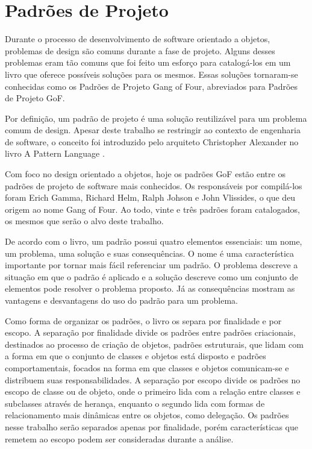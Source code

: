 \chapter{Padrões de Projeto}

Durante o processo de desenvolvimento de software 
orientado a objetos, 
problemas de design são comuns durante a 
fase de projeto. Alguns desses problemas 
eram tão comuns que foi feito um esforço para catalogá-los 
em um livro \cite{gamma:1995} que oferece possíveis soluções para os mesmos. 
Essas soluções tornaram-se conhecidas como 
os Padrões de Projeto Gang of Four, abreviados 
para Padrões de Projeto GoF.

Por definição, um padrão de projeto é uma solução 
reutilizável para um problema comum de design. Apesar 
deste trabalho se restringir ao contexto de engenharia 
de software, o conceito foi introduzido pelo arquiteto 
Christopher Alexander no livro A Pattern Language 
\cite{alexanderpatternlanguage}.

Com foco no design orientado a objetos, hoje os 
padrões GoF estão entre os padrões de 
projeto de software mais conhecidos. Os responsáveis 
por compilá-los foram Erich Gamma, Richard Helm, 
Ralph Johson e John Vlissides, o que deu origem ao 
nome Gang of Four. Ao todo, vinte e três 
padrões foram catalogados, os mesmos que serão o alvo 
deste trabalho.

De acordo com o livro, um padrão possui quatro elementos 
essenciais: um nome, um problema, uma solução e suas 
consequências. O nome é uma característica importante 
por tornar mais fácil referenciar um padrão. O problema 
descreve a situação em que o padrão é aplicado e 
a solução descreve como um conjunto de elementos pode 
resolver o problema proposto. Já as consequências 
mostram as vantagens e desvantagens do uso do padrão 
para um problema.

Como forma de organizar os padrões, o livro os separa 
por finalidade e por escopo. A separação por finalidade 
divide os padrões entre padrões criacionais, 
destinados ao processo de criação de objetos, padrões 
estruturais, que lidam com a forma em que o conjunto de 
classes e objetos está disposto e padrões comportamentais, 
focados na forma em que classes e objetos comunicam-se 
e distribuem suas responsabilidades. A separação por 
escopo divide os padrões no escopo de classe ou de objeto, 
onde o primeiro lida com a relação entre classes e 
subclasses através de herança, enquanto o segundo lida 
com formas de relacionamento mais dinâmicas entre os 
objetos, como delegação. Os padrões nesse trabalho 
serão separados apenas por finalidade, porém 
características que remetem ao escopo 
podem ser consideradas durante a análise.


